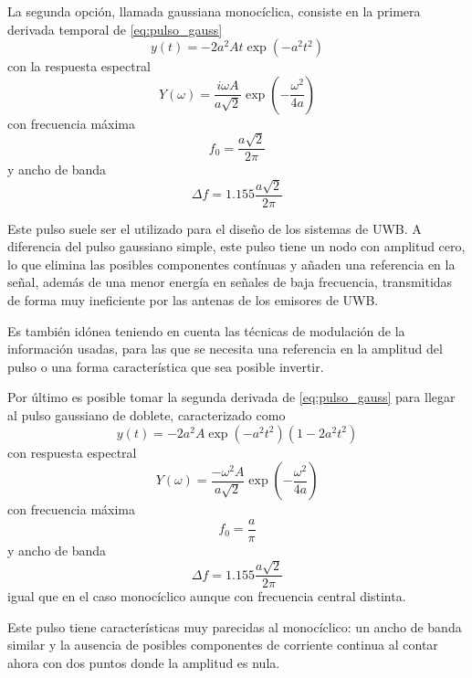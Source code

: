 La segunda opción, llamada gaussiana monocíclica, consiste en la primera derivada temporal de \eqref{eq:pulso_gauss}
\begin{equation}
    y(t) = -2 a^2 At\exp(-a^2 t^2)
\end{equation}
con la respuesta espectral
\begin{equation}
    Y(\omega) = \frac{i\omega A}{a\sqrt{2}}\exp(-\frac{\omega^2}{4a})
\end{equation}
con frecuencia máxima
\begin{equation}
    f_0 = \frac{a\sqrt{2}}{2\pi}
\end{equation}
y ancho de banda
\begin{equation}
    \Delta f = 1.155\frac{a\sqrt{2}}{2\pi}
\end{equation}

Este pulso suele ser el utilizado para el diseño de los sistemas de UWB.
A diferencia del pulso gaussiano simple, este pulso tiene un nodo con amplitud cero, lo que elimina las posibles componentes contínuas y añaden una referencia en la señal, además de una menor energía en señales de baja frecuencia, transmitidas de forma muy ineficiente por las antenas de los emisores de UWB.

Es también idónea teniendo en cuenta las técnicas de modulación de la información usadas, para las que se necesita una referencia en la amplitud del pulso o una forma característica que sea posible invertir.

Por último es posible tomar la segunda derivada de \eqref{eq:pulso_gauss} para llegar al pulso gaussiano de doblete, caracterizado como
\begin{equation}
    y(t) = -2 a^2 A\exp(-a^2 t^2)(1 - 2a^2 t^2)
\end{equation}
con respuesta espectral
\begin{equation}
    Y(\omega) = \frac{-\omega^2 A}{a\sqrt{2}}\exp(-\frac{\omega^2}{4a})
\end{equation}
con frecuencia máxima
\begin{equation}
    f_0 = \frac{a}{\pi}
\end{equation}
y ancho de banda
\begin{equation}
    \Delta f = 1.155\frac{a\sqrt{2}}{2\pi}
\end{equation}
igual que en el caso monocíclico aunque con frecuencia central distinta.

Este pulso tiene características muy parecidas al monocíclico: un ancho de banda similar y la ausencia de posibles componentes de corriente continua al contar ahora con dos puntos donde la amplitud es nula.

